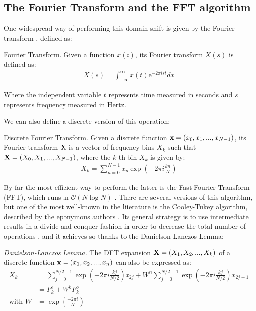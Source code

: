 \documentclass[../main.tex]{subfiles} \label{chapter_soa}
\begin{document}
\subsection{The Fourier Transform and the FFT algorithm} \label{subsection_fft}
\par One widespread way of performing this domain shift is given by the Fourier transform \cite{Weisstein2015}, defined as:
\theoremstyle{definition}
\begin{definition}{Fourier Transform}.
Given a function $x(t)$, its Fourier transform $X(s)$ is defined as:
\begin{align*}
X(s) = \int_{-\infty}^{\infty}x(t)\mathrm{e}^{-2\pi ist}dx
\end{align*}
\par Where the independent variable $t$ represents time measured in seconds and $s$ represents frequency measured in Hertz.
\end{definition}
\par We can also define a discrete version of this operation:
\begin{definition}{Discrete Fourier Transform}.
Given a discrete function $\mathbf{x} = (x_0,x_1,...,x_{N-1})$, its Fourier transform $\mathbf{X}$ is a vector of frequency bins $X_k$ such that $\mathbf{X} = (X_0, X_1,...,X_{N-1})$, where the $k$-th bin $X_k$ is given by:
\begin{align*}
X_k = \sum_{n=0}^{N-1}x_{n}\exp{\left(-2\pi i\frac{kn}{N}\right)}
\end{align*}
\end{definition}
\par By far the most efficient way to perform the latter is the Fast Fourier Transform (FFT), which runs in $\mathcal{O}(N\log{N})$ \cite{Smith2011}. There are several versions of this algorithm, but one of the most well-known in the literature is the Cooley-Tukey algorithm, described by the eponymous authors \cite{Cooley1965,Weisstein2015}. Its general strategy is to use intermediate results in a divide-and-conquer fashion in order to decrease the total number of operations \cite{Weisstein2015}, and it achieves so thanks to the Danielson-Lanczos Lemma:
\begin{lemma}
\emph{Danielson-Lanczos Lemma.} The DFT expansion $\mathbf{X} = (X_1, X_2,...,X_k)$ of a discrete function $\mathbf{x} = (x_1,x_2,...,x_n)$ can also be expressed as:\\
\begin{align*}
X_k &= \sum_{j=0}^{N/2-1}\exp{\left(-2\pi i\frac{kj}{N/2}\right)}x_{2j} + W^n\sum_{j=0}^{N/2-1}\exp{\left(-2\pi i\frac{kj}{N/2}\right)}x_{2j+1}\\
&=F^e_k + W^kF^o_k \\
\text{with } W &= \exp{\left(\frac{-2\pi i}{N}\right)}
\end{align*}
\end{lemma}
\end{document}

